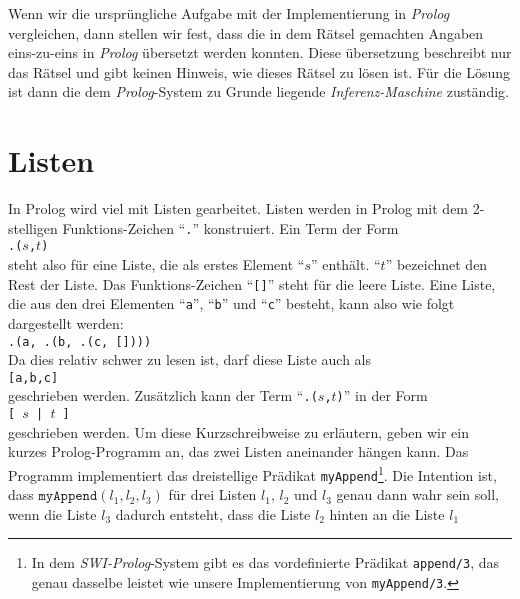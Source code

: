 Wenn wir die urspr\"{u}ngliche Aufgabe mit der Implementierung in \textsl{Prolog} vergleichen,
dann stellen wir fest, dass die in dem R\"{a}tsel gemachten Angaben eins-zu-eins in
\textsl{Prolog} \"{u}bersetzt werden konnten.  Diese \"{u}bersetzung beschreibt nur das R\"{a}tsel und
gibt keinen Hinweis, wie dieses R\"{a}tsel zu l\"{o}sen ist.  F\"{u}r die L\"{o}sung ist dann die dem
\textsl{Prolog}-System zu Grunde liegende \textsl{Inferenz-Maschine} zust\"{a}ndig.

\section{Listen}
In Prolog wird viel mit Listen gearbeitet.  Listen werden in Prolog mit dem
2-stelligen Funktions-Zeichen ``\texttt{.}'' konstruiert.  Ein Term der Form \\[0.2cm]
\hspace*{1.3cm} \texttt{.($s$,$t$)} \\[0.2cm]
steht also f\"{u}r eine Liste, die als erstes Element ``$s$'' enth\"{a}lt. ``$t$'' bezeichnet den
Rest der Liste.
Das Funktions-Zeichen ``\texttt{[]}'' steht
f\"{u}r die leere Liste. Eine Liste, die aus  den drei Elementen 
``\texttt{a}'', ``\texttt{b}'' und ``\texttt{c}'' besteht, kann also wie folgt dargestellt
werden: \\[0.2cm]
\hspace*{1.3cm} \texttt{.(a, .(b, .(c, [])))} \\[0.2cm]
Da dies relativ schwer zu lesen ist, darf diese Liste auch als \\[0.2cm]
\hspace*{1.3cm} \texttt{[a,b,c]} \\[0.2cm]
geschrieben werden.  Zus\"{a}tzlich kann der Term ``\texttt{.($s$,$t$)}'' in der Form \\[0.2cm]
\hspace*{1.3cm} \texttt{[ $s$ | $t$ ]} \\[0.2cm]
geschrieben werden.  Um diese Kurzschreibweise zu erl\"{a}utern, geben wir ein kurzes
Prolog-Programm an, das zwei Listen aneinander h\"{a}ngen kann.  
Das Programm implementiert das dreistellige Pr\"{a}dikat \texttt{myAppend}\footnote{In dem
  \textsl{SWI-Prolog}-System gibt es das vordefinierte Pr\"{a}dikat \texttt{append/3},
  das genau dasselbe leistet wie unsere Implementierung von \texttt{myAppend/3}.}.  
Die Intention ist,
dass $\texttt{myAppend}(l_1,l_2,l_3)$ f\"{u}r drei Listen $l_1$, $l_2$ und $l_3$ genau dann
wahr sein soll,
wenn die Liste $l_3$ dadurch entsteht, dass die Liste $l_2$ hinten an die Liste $l_1$

